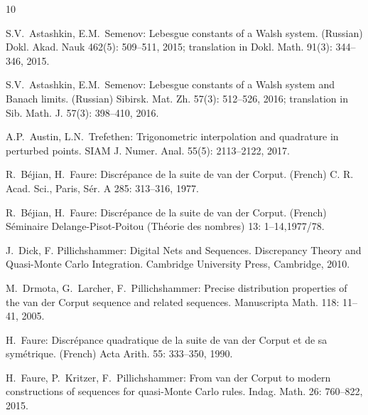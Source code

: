 \documentclass[12pt]{article}
\begin{document}
\begin{thebibliography}{10}

 S.V.~Astashkin, E.M.~Semenov: Lebesgue constants of a Walsh system. (Russian) Dokl. Akad. Nauk 462(5): 509--511, 2015; translation in Dokl. Math. 91(3): 344–346, 2015.

 S.V.~Astashkin, E.M.~Semenov: Lebesgue constants of a Walsh system and Banach limits. (Russian)
Sibirsk. Mat. Zh. 57(3): 512--526, 2016; translation in Sib. Math. J. 57(3): 398--410, 2016.

 A.P.~Austin, L.N.~Trefethen: Trigonometric interpolation and quadrature in perturbed points. SIAM J. Numer. Anal. 55(5): 2113--2122, 2017.

 R.~B\'{e}jian, H.~Faure: Discr\'{e}pance de la suite de van der Corput. (French) C. R. Acad. Sci., Paris, S\'{e}r. A 285: 313--316, 1977.

 R.~B\'{e}jian, H.~Faure: Discr\'{e}pance de la suite de van der Corput. (French) S\'{e}minaire Delange-Pisot-Poitou (Th\'{e}orie des nombres) 13: 1--14,1977/78.


 J.~Dick, F. Pillichshammer: Digital Nets and Sequences. Discrepancy Theory and Quasi-Monte Carlo Integration. Cambridge University Press, Cambridge, 2010.


 M.~Drmota, G.~Larcher, F.~Pillichshammer: Precise distribution properties of the van der Corput sequence and related sequences. Manuscripta Math. 118: 11--41, 2005.


 H.~Faure: Discr\'{e}pance quadratique de la suite de van der Corput et de sa sym\'{e}trique. (French) Acta Arith. 55: 333--350, 1990.

 H.~Faure, P.~Kritzer, F.~Pillichshammer: From van der Corput to modern constructions of sequences for quasi-Monte Carlo rules. Indag. Math. 26: 760--822, 2015.


\end{thebibliography}
\end{document}
